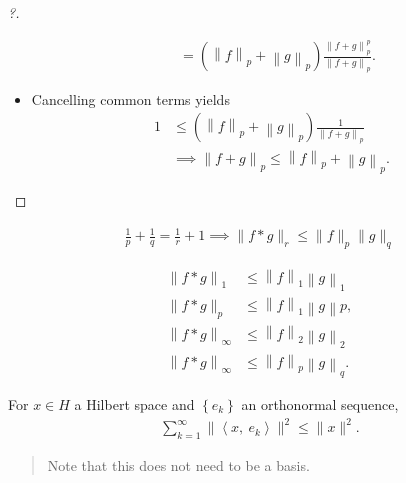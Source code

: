 \begin{proof}[?]
\begin{itemize}
\begin{align*}
  &= \left( {\left\lVert {f} \right\rVert}_p + {\left\lVert {g} \right\rVert}_p \right)  \frac{{\left\lVert {f+g} \right\rVert}_p^p}{{\left\lVert {f+g} \right\rVert}_p}
  .\end{align*}
\item
  Cancelling common terms yields
  \begin{align*}  
  1 &\leq \left( {\left\lVert {f} \right\rVert}_p + {\left\lVert {g} \right\rVert}_p \right) \frac{1}{{\left\lVert {f+g} \right\rVert}_p} \\
  &\implies 
  {\left\lVert {f+g} \right\rVert}_p
  \leq {\left\lVert {f} \right\rVert}_p + {\left\lVert {g} \right\rVert}_p 
  .\end{align*}
\end{itemize}

\end{proof}

\begin{proposition}

\begin{align*}
\frac 1 p + \frac 1 q = \frac 1 r + 1 \implies
\|f \ast g\|_{r} \leq\|f\|_{p}\|g\|_{q}
\end{align*}

\end{proposition}

\begin{remark}

\begin{align*}  
{\left\lVert {f\ast g} \right\rVert}_1      & \leq {\left\lVert {f} \right\rVert}_1 {\left\lVert {g} \right\rVert}_1 \\
\|f * g\|_{p}         & \leq {\left\lVert {f} \right\rVert}_1 {\left\lVert {g} \right\rVert}p, \\
{\left\lVert {f\ast g} \right\rVert}_\infty & \leq {\left\lVert {f} \right\rVert}_2 {\left\lVert {g} \right\rVert}_2 \\
{\left\lVert {f\ast g} \right\rVert}_\infty & \leq {\left\lVert {f} \right\rVert}_p {\left\lVert {g} \right\rVert}_q
.\end{align*}

\end{remark}

\begin{proposition}

For \(x\in H\) a Hilbert space and \(\left\{{e_k}\right\}\) an
orthonormal sequence,
\begin{align*}  
\sum_{k=1}^{\infty}\| {\left\langle {x},~{e_{k} } \right\rangle} \|^{2} \leq \|x\|^{2}
.\end{align*}

\begin{quote}
Note that this does not need to be a basis.
\end{quote}

\end{proposition}

